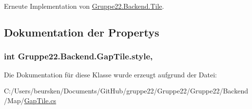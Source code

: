 Erneute Implementation von \hyperlink{class_gruppe22_1_1_backend_1_1_tile_a109ab3e77ffca9d44c95a711af3491dc}{Gruppe22.\-Backend.\-Tile}.



\subsection{Dokumentation der Propertys}
\hypertarget{class_gruppe22_1_1_backend_1_1_gap_tile_a2833c0484bcea6f07f1643bb44137116}{
\subsubsection[{style}]{\setlength{\rightskip}{0pt plus 5cm}int Gruppe22.\-Backend.\-Gap\-Tile.\-style\hspace{0.3cm}{\ttfamily [get]}, {\ttfamily [set]}}}\label{class_gruppe22_1_1_backend_1_1_gap_tile_a2833c0484bcea6f07f1643bb44137116}


Die Dokumentation für diese Klasse wurde erzeugt aufgrund der Datei\-:\begin{DoxyCompactItemize}
\item 
C\-:/\-Users/beursken/\-Documents/\-Git\-Hub/gruppe22/\-Gruppe22/\-Gruppe22/\-Backend/\-Map/\hyperlink{_gap_tile_8cs}{Gap\-Tile.\-cs}\end{DoxyCompactItemize}
